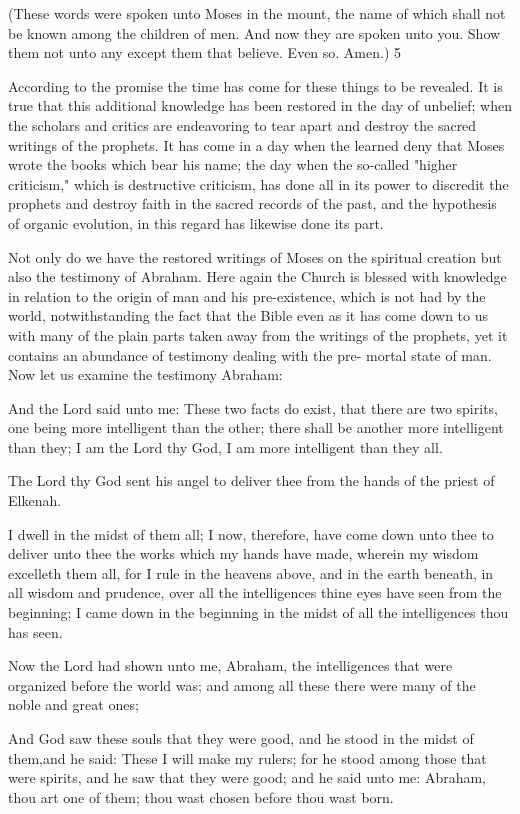 (These words were spoken unto Moses in the mount, the name of which shall not be known
among the children of men. And now they are spoken unto you. Show them not unto any
except them that believe. Even so. Amen.) 5

According to the promise the time has come for these things to be revealed. It is true that this
additional knowledge has been restored in the day of unbelief; when the scholars and critics
are endeavoring to tear apart and destroy the sacred writings of the prophets. It has come in a
day when the learned deny that Moses wrote the books which bear his name; the day when
the so-called "higher criticism," which is destructive criticism, has done all in its power to
discredit the prophets and destroy faith in the sacred records of the past, and the hypothesis
of organic evolution, in this regard has likewise done its part.

Not only do we have the restored writings of Moses on the spiritual creation but also the
testimony of Abraham. Here again the Church is blessed with knowledge in relation to the
origin of man and his pre-existence, which is not had by the world, notwithstanding the fact
that the Bible even as it has come down to us with many of the plain parts taken away from
the writings of the prophets, yet it contains an abundance of testimony dealing with the pre-
mortal state of man. Now let us examine the testimony Abraham:

And the Lord said unto me: These two facts do exist, that there are two spirits, one being
more intelligent than the other; there shall be another more intelligent than they; I am the
Lord thy God, I am more intelligent than they all.

The Lord thy God sent his angel to deliver thee from the hands of the priest of Elkenah.

I dwell in the midst of them all; I now, therefore, have come down unto thee to deliver unto
thee the works which my hands have made, wherein my wisdom excelleth them all, for I rule
in the heavens above, and in the earth beneath, in all wisdom and prudence, over all the
intelligences thine eyes have seen from the beginning; I came down in the beginning in the
midst of all the intelligences thou has seen.

Now the Lord had shown unto me, Abraham, the intelligences that were organized before the
world was; and among all these there were many of the noble and great ones;

And God saw these souls that they were good, and he stood in the midst of them,and he said:
These I will make my rulers; for he stood among those that were spirits, and he saw that they
were good; and he said unto me: Abraham, thou art one of them; thou wast chosen before
thou wast born.

